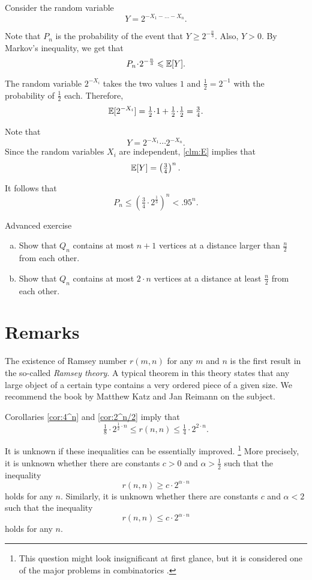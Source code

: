 Consider the random variable 
\[Y=2^{-X_1-\dots-X_n}.\]

Note that $P_n$ is the probability of the event that $Y\ge 2^{-\frac n3}$.
Also, $Y>0$. 
By Markov's inequality, we get that
\[P_n\cdot 2^{-\frac n3}\le \EE[Y].\]

The random variable $2^{-X_i}$ takes the two values $1$ and $\tfrac12=2^{-1}$ with the probability of $\tfrac12$ each.
Therefore, 
\[\EE[2^{-X_i}]=\tfrac12\cdot 1+\tfrac12\cdot\tfrac12=\tfrac 34.\]

Note that 
\[Y=2^{-X_1}\cdots 2^{-X_n}.\]
Since the random variables $X_i$ are independent, \ref{clm:E} implies that
\[\mathbb{E}[Y]=\left(\tfrac34\right)^n.\]

It follows that 
\[P_n\le \left(\tfrac34\cdot 2^{\frac13}\right)^n< .95^n.\]
\qedsf

\begin{thm}{Advanced exercise}\label{ex:lin-Qn}
\begin{enumerate}[(a)]
\item \label{ex:lin-Qn:n+1} Show that $Q_n$ contains at most $n+1$ vertices at a distance larger than $\tfrac n2$ from each other.
\item \label{ex:lin-Qn:2n} Show that $Q_n$ contains at most $2\cdot n$ vertices at a distance at least $\tfrac n2$ from each other.
\end{enumerate}
\end{thm}
 

\section{Remarks}

The existence of Ramsey number $r(m,n)$ for any $m$ and $n$ is the first result in the so-called \textit{Ramsey theory}. 
A typical theorem in this theory states that any large object of a certain type contains a very ordered piece of a given size.
We recommend the book by Matthew Katz and Jan Reimann \cite{katz-reimann} on the subject. 

Corollaries \ref{cor:4^n} and \ref{cor:2^n/2} imply that 
\[\tfrac18\cdot 2^{\frac12\cdot n}\le r(n,n)\le \tfrac14\cdot 2^{2\cdot n}.\]

It is unknown if these inequalities can be essentially improved.%
\footnote{This question might look insignificant at first glance, but it is considered one of the major problems in combinatorics \cite{gowers}.}
More precisely, it is unknown whether there are constants $c>0$ and $\alpha>\tfrac12$ such that the inequality
\[r(n,n)\ge c\cdot 2^{\alpha\cdot n}\]
holds for any $n$.
Similarly, it is unknown whether there are constants $c$ and $\alpha<2$ such that the inequality
\[r(n,n)\le c\cdot 2^{\alpha\cdot n}\]
holds for any $n$.

